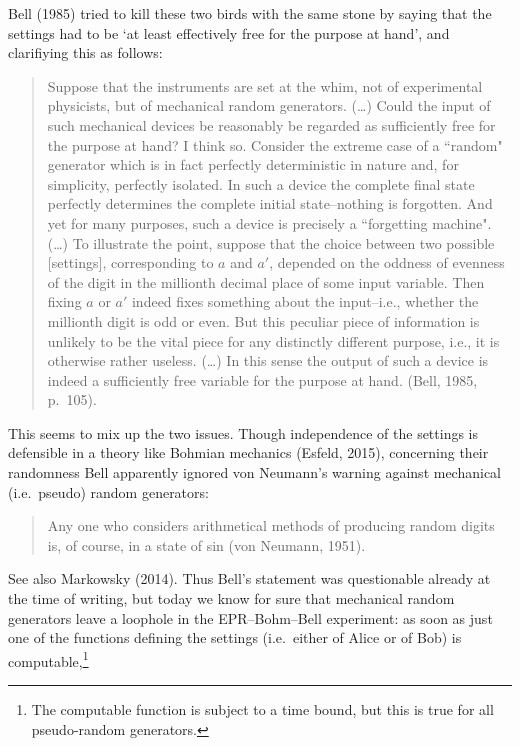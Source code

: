 \documentclass[11pt,a4paper]{article}
\numberwithin{equation}{section}
\begin{document}
 \noindent  Bell (1985) tried to kill these two birds with the same stone by saying that the settings had to be `at least effectively free for the purpose at hand', and clarifiying this as follows: 
\begin{quote}\begin{small}
Suppose that the instruments are set at the whim, not of experimental physicists, but of  mechanical random generators. (\ldots)  
Could the input of such mechanical devices be reasonably be regarded as sufficiently free for the purpose at hand? I think so. Consider the extreme case of a ``random" generator which is in fact perfectly deterministic in nature and, for simplicity, perfectly isolated. In such a device the complete final state perfectly determines the complete initial state--nothing is forgotten. And yet for many purposes, such a device is  precisely a ``forgetting machine". (\ldots) To illustrate the point, suppose that the choice between two possible [settings], corresponding to $a$ and $a'$, depended on the oddness of evenness of the digit in the millionth decimal place of some input variable. Then fixing $a$ or $a'$ indeed fixes something about the input--i.e., whether the millionth digit is odd or even. But this peculiar piece of information is unlikely to be the vital piece for any distinctly different purpose, i.e., it is otherwise rather useless. (\ldots) In this sense the output of such a device is indeed a sufficiently free variable for the purpose at hand. (Bell, 1985, p.\ 105).
\end{small}\end{quote}
This seems to mix up the two issues. Though independence of the settings is defensible in a theory like Bohmian mechanics (Esfeld, 2015), concerning their randomness 
Bell apparently ignored von Neumann's warning against mechanical (i.e.\ pseudo) random generators:
\begin{quote}\begin{small}
Any one who considers arithmetical methods of producing random digits is, of course, in a state of sin (von Neumann, 1951).
\end{small}\end{quote} 
See also Markowsky (2014). Thus Bell's statement was questionable already at the time of writing, but today we  know for sure that mechanical random generators leave a  loophole in the EPR--Bohm--Bell experiment: as soon as just one of the functions defining the settings (i.e.\ either of Alice or of Bob) is computable,\footnote{The computable function is subject to a time bound, but this is true for all pseudo-random generators.}
\end{document}
